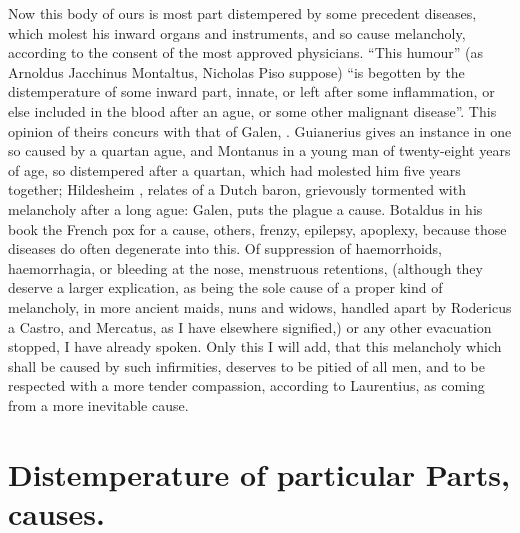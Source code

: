 Now this body of ours is most part distempered by some precedent diseases,
which molest his inward organs and instruments, and so 
cause melancholy, according to the consent of the most approved physicians.
\enquote{This humour} (as \Avicenna{}  Arnoldus 
Jacchinus  Montaltus,
 Nicholas Piso 
\etc{} suppose) \enquote{is begotten by the distemperature of some inward part, innate,
or left after some inflammation, or else included in the blood after an
ague, or some other malignant disease}. This opinion of
theirs concurs with that of Galen, . Guianerius gives an instance in one so caused by a quartan ague, and
Montanus  in a young man of twenty-eight
years of age, so distempered after a quartan, which had molested him five years
together; Hildesheim , relates of a
Dutch baron, grievously tormented with melancholy after a long
ague: Galen, 
puts the plague a cause. Botaldus in his book  the French pox for a cause, others, frenzy, epilepsy, apoplexy,
because those diseases do often degenerate into this. Of suppression of
haemorrhoids, haemorrhagia, or bleeding at the nose, menstruous retentions,
(although they deserve a larger explication, as being the sole cause of a
proper kind of melancholy, in more ancient maids, nuns and widows, handled
apart by Rodericus a Castro, and Mercatus, as I have elsewhere signified,) or
any other evacuation stopped, I have already spoken. Only this I will add, that
this melancholy which shall be caused by such infirmities, deserves to be
pitied of all men, and to be respected with a more tender compassion, according
to Laurentius, as coming from a more inevitable cause.
\section{Distemperature of particular Parts, causes.}

